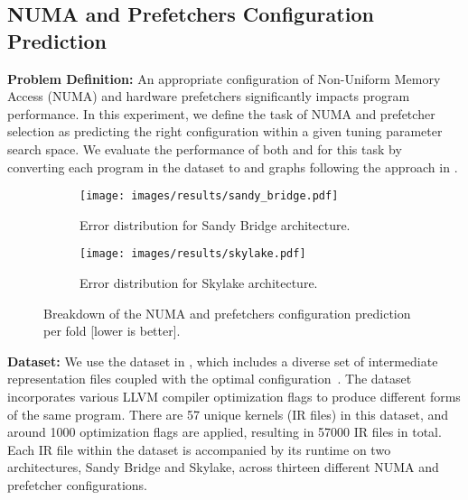 \subsection{NUMA and Prefetchers Configuration Prediction}
\vspace{-4pt}
\textbf{Problem Definition:} 
An appropriate configuration of Non-Uniform Memory Access (NUMA) and hardware prefetchers significantly impacts program performance. In this experiment, we define the task of NUMA and prefetcher selection as predicting the right configuration within a given tuning parameter search space. We evaluate the performance of both \programl and \ourtool for this task by converting each program in the dataset to \programl and \ourtool graphs following the approach in \cite{tehranijamsaz2022learning}. 

\begin{figure}[H]
\vspace{-10pt}
     \begin{subfigure}[t]{0.5\textwidth}
         \texttt{[image: images/results/sandy\_bridge.pdf]}
         \caption{Error distribution for Sandy Bridge architecture.}
         \label{fig:res_NUMA_sandy}
     \end{subfigure}
     \hfill
     \begin{subfigure}[t]{0.5\textwidth}
         \centering
         \texttt{[image: images/results/skylake.pdf]}
         \caption{Error distribution for Skylake architecture.}
         \label{fig:res_NUMA_skylake}
     \end{subfigure}
     \caption{Breakdown of the NUMA and prefetchers configuration prediction per fold [lower is better].}
     \label{fig:res_NUMA}
     \vspace{-10pt}
    \end{figure}

\vspace{-5pt}
\textbf{Dataset:} We use the dataset in \cite{tehranijamsaz2022learning}, which includes
a diverse set of intermediate representation files coupled with the optimal configuration~\cite{sanchez2020modeling}. The dataset incorporates various LLVM compiler optimization flags to produce different forms of the same program. There are 57 unique kernels (IR files) in this dataset, and around 1000 optimization flags are applied, resulting in 57000 IR files in total. Each IR file within the dataset is accompanied by its runtime on two architectures, Sandy Bridge and Skylake, across thirteen different NUMA and prefetcher configurations.
    
